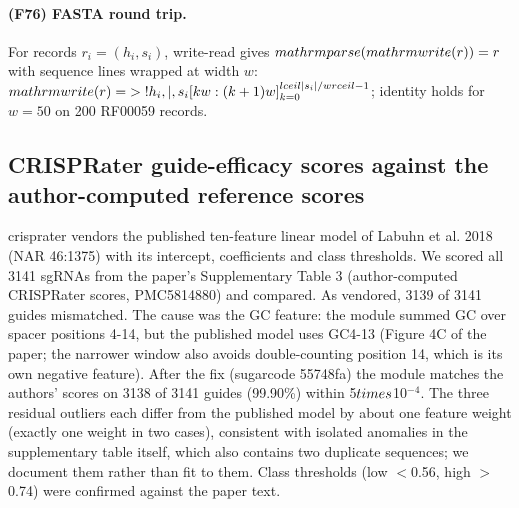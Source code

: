 \paragraph{(F76) FASTA round trip.} For records $r_i=(h_i,s_i)$, write-read gives $\\mathrm{parse}(\\mathrm{write}(r))=r$ with sequence lines wrapped at width $w$: $\\mathrm{write}(r)=\\{>\\!h_i\\}\\,\\|\\,\\{s_i[kw:(k+1)w]\\}_{k=0}^{\\lceil |s_i|/w\\rceil-1}$; identity holds for $w=50$ on 200 RF00059 records.
\subsection{CRISPRater guide-efficacy scores against the author-computed reference scores}
crisprater vendors the published ten-feature linear model of Labuhn et al. 2018 (NAR 46:1375) with its intercept, coefficients and class thresholds. We scored all 3141 sgRNAs from the paper's Supplementary Table 3 (author-computed CRISPRater scores, PMC5814880) and compared. As vendored, 3139 of 3141 guides mismatched. The cause was the GC feature: the module summed GC over spacer positions 4-14, but the published model uses GC4-13 (Figure 4C of the paper; the narrower window also avoids double-counting position 14, which is its own negative feature). After the fix (sugarcode 55748fa) the module matches the authors' scores on 3138 of 3141 guides (99.90\%) within 5$\\times$10$^{-4}$. The three residual outliers each differ from the published model by about one feature weight (exactly one weight in two cases), consistent with isolated anomalies in the supplementary table itself, which also contains two duplicate sequences; we document them rather than fit to them. Class thresholds (low $<$0.56, high $>$0.74) were confirmed against the paper text.
